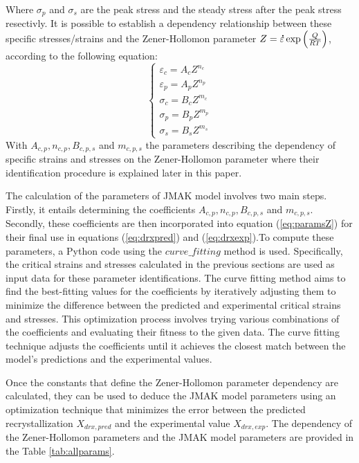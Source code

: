 \documentclass[metals,article,submit,pdftex,moreauthors]{Definitions/mdpi}
\DeclareRobustCommand{\mdot}[1]{\accentset{\mbox{\bfseries .}}{#1}}
\begin{document}
Where $\sigma_p$ and $\sigma_s$ are the peak stress and the steady stress after the peak stress resectivly. It is possible to establish a dependency relationship between these specific stresses/strains and the Zener-Hollomon parameter $Z = \mdot\varepsilon \exp{\left(\frac{Q}{RT}\right)} \label{eq:ArZ}$, according to the following equation:
\begin{equation}
\begin{cases}
\varepsilon_c = A_cZ^{n_c} \\ \varepsilon_p = A_pZ^{n_p} \\ \sigma_c = B_cZ^{m_c} \\ \sigma_p = B_pZ^{m_p}\\ \sigma_s = B_sZ^{m_s}
\end{cases}
\label{eq:paramsZ}
\end{equation}
With $A_{c,p}, n_{c,p}, B_{c,p,s}$ and $m_{c,p,s}$ the parameters describing the dependency of specific strains and stresses on the Zener-Hollomon parameter where their identification procedure is explained later in this paper.

The calculation of the parameters of JMAK model involves two main steps. Firstly, it entails determining the coefficients $A_{c,p}, n_{c,p}, B_{c,p,s}$ and $m_{c,p,s}$. Secondly, these coefficients are then incorporated into equation (\ref{eq:paramsZ}) for their final use in equations (\ref{eq:drxpred}) and (\ref{eq:drxexp}).To compute these parameters, a Python code using the $curve\_fitting$ method is used. Specifically, the critical strains and stresses calculated in the previous sections are used as input data for these parameter identifications. The curve fitting method aims to find the best-fitting values for the coefficients by iteratively adjusting them to minimize the difference between the predicted and experimental critical strains and stresses. This optimization process involves trying various combinations of the coefficients and evaluating their fitness to the given data. The curve fitting technique adjusts the coefficients until it achieves the closest match between the model's predictions and the experimental values.


Once the constants that define the Zener-Hollomon parameter dependency are calculated, they can be used to deduce the JMAK model parameters using an optimization technique that minimizes the error between the predicted recrystallization $X_{drx, pred}$ and the experimental value $X_{drx, exp}$. The dependency of the Zener-Hollomon parameters and the JMAK model parameters  are provided in the Table \ref{tab:allparams}.
\end{document}
